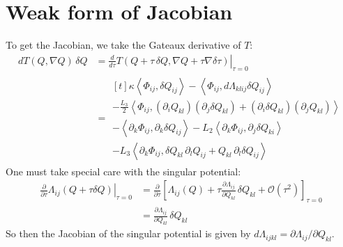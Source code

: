 \documentclass[reqno]{article}
\begin{document}
\section{Weak form of Jacobian}

To get the Jacobian, we take the Gateaux derivative of $T$:
\begin{equation}
\begin{split}
    dT(Q, \nabla Q) \, \delta Q
    &=
    \left. \frac{d}{d \tau} T(Q + \tau \, \delta Q, \nabla Q + \tau \nabla \delta \tau) \right|_{\tau = 0} \\
    &=
    \begin{multlined}[t]
        \kappa \left< \Phi_{ij}, \delta Q_{ij} \right>
        - \left< \Phi_{ij}, d\Lambda_{klij} \delta Q_{ij} \right> \\
        - \frac{L_3}{2} \left< \Phi_{ij}, 
            \left( \partial_i Q_{kl} \right) \left( \partial_j \delta Q_{kl} \right)
            + \left( \partial_i \delta Q_{kl} \right) \left( \partial_j Q_{kl} \right) \right> \\
        - \left< \partial_k \Phi_{ij}, \partial_k \delta Q_{ij} \right>
        - L_2 \left< \partial_k \Phi_{ij}, \partial_j \delta Q_{ki} \right> \\
        - L_3 \left< \partial_k \Phi_{ij}, \delta Q_{kl} \, \partial_l Q_{ij} + Q_{kl} \, \partial_l \delta Q_{ij} \right>
    \end{multlined}
\end{split}
\end{equation}
One must take special care with the singular potential:
\begin{equation}
\begin{split}
    \left. \frac{\partial}{\partial \tau} \Lambda_{ij}(Q + \tau \delta Q) \right|_{\tau = 0}
    &=
    \frac{\partial}{\partial \tau} \left[ \Lambda_{ij}(Q) 
        + \tau \frac{\partial \Lambda_{ij}}{\partial Q_{kl}} \, \delta Q_{kl}
        + \mathcal{O}(\tau^2) \right]_{\tau = 0} \\
    &=
    \frac{\partial \Lambda_{ij}}{\partial Q_{kl}} \, \delta Q_{kl}
\end{split}
\end{equation}
So then the Jacobian of the singular potential is given by $d\Lambda_{ijkl} = \partial \Lambda_{ij}/ \partial Q_{kl}$.
\end{document}
